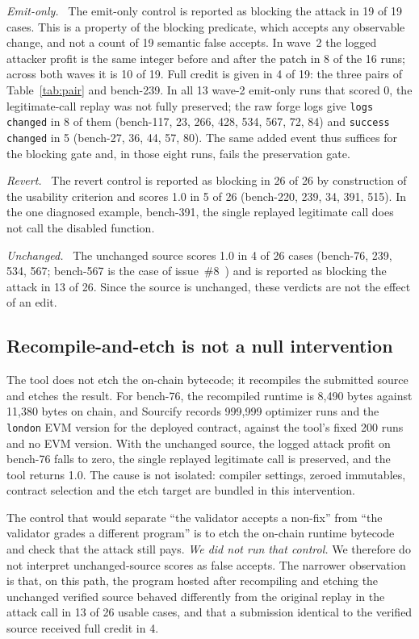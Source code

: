 \documentclass[conference]{IEEEtran}
\newcommand{\code}[1]{\texttt{#1}}
\newcommand{\para}[1]{\textit{#1.}\ }
\begin{document}
\para{Emit-only} The emit-only control is reported as blocking the attack in 19 of 19 cases. This is a property of the blocking predicate, which accepts any observable change, and not a count of 19 semantic false accepts. In wave~2 the logged attacker profit is the same integer before and after the patch in 8 of the 16 runs; across both waves it is 10 of 19. Full credit is given in 4 of 19: the three pairs of Table~\ref{tab:pair} and bench-239. In all 13 wave-2 emit-only runs that scored 0, the legitimate-call replay was not fully preserved; the raw forge logs give \code{logs changed} in 8 of them (bench-117, 23, 266, 428, 534, 567, 72, 84) and \code{success changed} in 5 (bench-27, 36, 44, 57, 80). The same added event thus suffices for the blocking gate and, in those eight runs, fails the preservation gate.

\para{Revert} The revert control is reported as blocking in 26 of 26 by construction of the usability criterion and scores 1.0 in 5 of 26 (bench-220, 239, 34, 391, 515). In the one diagnosed example, bench-391, the single replayed legitimate call does not call the disabled function.

\para{Unchanged} The unchanged source scores 1.0 in 4 of 26 cases (bench-76, 239, 534, 567; bench-567 is the case of issue~\#8~\cite{moore}) and is reported as blocking the attack in 13 of 26. Since the source is unchanged, these verdicts are not the effect of an edit.

\subsection{Recompile-and-etch is not a null intervention}
\label{sec:recompile}
The tool does not etch the on-chain bytecode; it recompiles the submitted source and etches the result. For bench-76, the recompiled runtime is 8,490 bytes against 11,380 bytes on chain, and Sourcify records 999,999 optimizer runs and the \code{london} EVM version for the deployed contract, against the tool's fixed 200 runs and no EVM version. With the unchanged source, the logged attack profit on bench-76 falls to zero, the single replayed legitimate call is preserved, and the tool returns 1.0. The cause is not isolated: compiler settings, zeroed immutables, contract selection and the etch target are bundled in this intervention.

The control that would separate ``the validator accepts a non-fix'' from ``the validator grades a different program'' is to etch the on-chain runtime bytecode and check that the attack still pays. \emph{We did not run that control.} We therefore do not interpret unchanged-source scores as false accepts. The narrower observation is that, on this path, the program hosted after recompiling and etching the unchanged verified source behaved differently from the original replay in the attack call in 13 of 26 usable cases, and that a submission identical to the verified source received full credit in 4.
\end{document}
